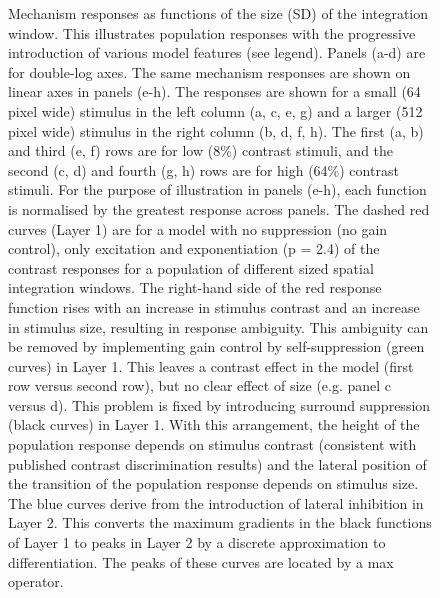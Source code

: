 \documentclass[
]{article}
\begin{document}
\begin{figure}
\caption{Mechanism responses as functions of the size (SD) of the integration window. This illustrates population responses with the progressive introduction of various model features (see legend). Panels (a-d) are for double-log axes. The same mechanism responses are shown on linear axes in panels (e-h). The responses are shown for a small (64 pixel wide) stimulus in the left column (a, c, e, g) and a larger (512 pixel wide) stimulus in the right column (b, d, f, h). The first (a, b) and third (e, f) rows are for low (8\%) contrast stimuli, and the second (c, d) and fourth (g, h) rows are for high (64\%) contrast stimuli. For the purpose of illustration in panels (e-h), each function is normalised by the greatest response across panels. The dashed red curves (Layer 1) are for a model with no suppression (no gain control), only excitation and exponentiation (p = 2.4) of the contrast responses for a population of different sized spatial integration windows. The right-hand side of the red response function rises with an increase in stimulus contrast and an increase in stimulus size, resulting in response ambiguity. This ambiguity can be removed by implementing gain control by self-suppression (green curves) in Layer 1. This leaves a contrast effect in the model (first row versus second row), but no clear effect of size (e.g. panel c versus d). This problem is fixed by introducing surround suppression (black curves) in Layer 1. With this arrangement, the height of the population response depends on stimulus contrast (consistent with published contrast discrimination results) and the lateral position of the transition of the population response depends on stimulus size. The blue curves derive from the introduction of lateral inhibition in Layer 2. This converts the maximum gradients in the black functions of Layer 1 to peaks in Layer 2 by a discrete approximation to differentiation. The peaks of these curves are located by a max operator.}\label{fig:figureS3}
\end{figure}
\end{document}
